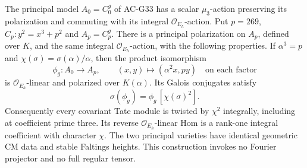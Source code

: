 \begin{corollary}
\label{AC-G33-twist}
The principal model $A_0=C_0^g$ of AC-G33 has a scalar
$\mu_3$-action preserving its polarization and commuting
with its integral $\mathcal O_{E_h}$-action.
Put $p=269$, $C_p:y^2=x^3+p^2$ and $A_p=C_p^g$.
There is a principal polarization on $A_p$, defined over
$K$, and the same integral $\mathcal O_{E_h}$-action,
with the following properties.  If $\alpha^3=p$ and
$\chi(\sigma)=\sigma(\alpha)/\alpha$, then the product
isomorphism
\[
 \phi_g:A_0\longrightarrow A_p,
       \qquad (x,y)\longmapsto(\alpha^2x,py)
                  \quad\text{on each factor}                 \tag{G33.14}
\]
is $\mathcal O_{E_h}$-linear and polarized over $K(\alpha)$.
Its Galois conjugates satisfy
\[
                  \sigma(\phi_g)=\phi_g\,[\chi(\sigma)^2].
                                                               \tag{G33.15}
\]
Consequently every covariant Tate module is twisted by
$\chi^2$ integrally, including at coefficient prime three.
Its reverse $\mathcal O_{E_h}$-linear Hom is a rank-one
integral coefficient with character $\chi$.
The two principal varieties have identical geometric CM
data and stable Faltings heights.  This construction invokes
no Fourier projector and no full regular tensor.
\end{corollary}
